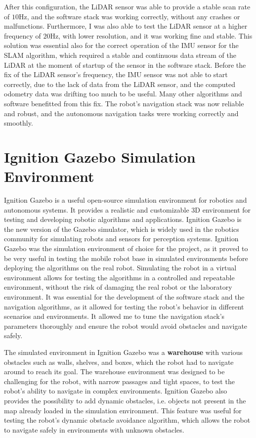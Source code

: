 After this configuration, the LiDAR sensor was able to provide a stable scan rate of $10$Hz,
and the software stack was working correctly, without any crashes or malfunctions.
Furthermore, I was also able to test the LiDAR sensor at a higher frequency of $20$Hz, 
with lower resolution, and it was working fine and stable.
This solution was essential also for the correct operation of the IMU sensor for the SLAM algorithm, which required
a stable and continuous data stream of the LiDAR at the moment of startup of the sensor in the software stack. Before the 
fix of the LiDAR sensor's frequency, the IMU sensor was not able to start correctly, due to the lack of data
from the LiDAR sensor, and the computed odometry data was drifting too much to be useful.
Many other algorithms and software benefitted from this fix. The robot's navigation stack was now reliable and robust,
and the autonomous navigation tasks were working correctly and smoothly.


\section{Ignition Gazebo Simulation Environment}

Ignition Gazebo is a useful open-source simulation environment for robotics and autonomous systems.
It provides a realistic and customizable 3D environment for testing and developing robotic algorithms and applications.
Ignition Gazebo is the new version of the Gazebo simulator, which is widely used in the robotics community for simulating
robots and sensors for perception systems. Ignition Gazebo was the simulation environment of choice for the project,
as it proved to be very useful in testing the mobile robot base in simulated environments before deploying the algorithms
on the real robot. Simulating the robot in a virtual environment allows for testing the algorithms in 
a controlled and repeatable environment, without the risk of damaging the real robot or the laboratory environment.
It was essential for the development of the software stack and the navigation algorithms, as it allowed for testing
the robot's behavior in different scenarios and environments. It allowed me to tune the navigation stack's parameters
thoroughly and ensure the robot would avoid obstacles and navigate safely.

The simulated environment in Ignition Gazebo was a \textbf{warehouse} with various obstacles such as walls, shelves, and boxes,
which the robot had to navigate around to reach its goal. The warehouse environment was designed to be challenging
for the robot, with narrow passages and tight spaces, to test the robot's ability to navigate in complex environments.
Ignition Gazebo also provides the possibility to add dynamic obstacles, i.e. objects not present in the map
already loaded in the simulation environment. This feature was useful for testing the robot's dynamic obstacle avoidance
algorithm, which allows the robot to navigate safely in environments with unknown obstacles.

